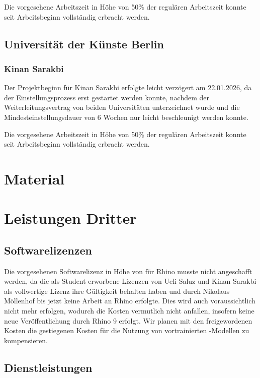 \documentclass[type=zwischenbericht]{zukunftbau}
\begin{document}
Die vorgesehene Arbeitszeit in Höhe von 50\% der regulären Arbeitszeit konnte seit Arbeitsbeginn vollständig erbracht werden.

\subsection{Universität der Künste Berlin}

\subsubsection{Kinan Sarakbi}
Der Projektbeginn für Kinan Sarakbi erfolgte leicht verzögert am 22.01.2026, da der Einstellungsprozess erst gestartet werden konnte, nachdem der Weiterleitungsvertrag von beiden Universitäten unterzeichnet wurde und die Mindesteinstellungsdauer von 6 Wochen nur leicht beschleunigt werden konnte.

Die vorgesehene Arbeitszeit in Höhe von 50\% der regulären Arbeitszeit konnte seit Arbeitsbeginn vollständig erbracht werden.

\section{Material}

\section{Leistungen Dritter}

\subsection{Softwarelizenzen}

Die vorgesehenen Softwarelizenz in Höhe von für Rhino musste nicht angeschafft werden, da die als Student erworbene Lizenzen von Ueli Saluz und Kinan Sarakbi als vollwertige Lizenz ihre Gültigkeit behalten haben und durch Nikolaus Möllenhof bis jetzt keine Arbeit an Rhino erfolgte. Dies wird auch voraussichtlich nicht mehr erfolgen, wodurch die Kosten vermutlich nicht anfallen, insofern keine neue Veröffentlichung durch Rhino 9 erfolgt. Wir planen mit den freigewordenen Kosten die gestiegenen Kosten für die Nutzung von vortrainierten -Modellen zu kompensieren.

\subsection{Dienstleistungen}
\end{document}

